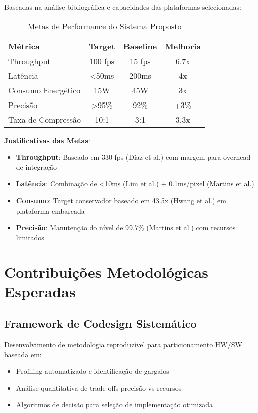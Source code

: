 Baseadas na análise bibliográfica e capacidades das plataformas selecionadas:

\begin{table}[H]
\centering
\caption{Metas de Performance do Sistema Proposto}
\begin{tabular}{|l|c|c|c|}
\hline
\textbf{Métrica} & \textbf{Target} & \textbf{Baseline} & \textbf{Melhoria} \\
\hline
Throughput & 100 fps & 15 fps & 6.7x \\
Latência & <50ms & 200ms & 4x \\
Consumo Energético & 15W & 45W & 3x \\
Precisão & >95\% & 92\% & +3\% \\
Taxa de Compressão & 10:1 & 3:1 & 3.3x \\
\hline
\end{tabular}
\label{tab:performance_targets}
\end{table}

\textbf{Justificativas das Metas}:
\begin{itemize}
\item \textbf{Throughput}: Baseado em 330 fps (Díaz et al.) com margem para overhead de integração
\item \textbf{Latência}: Combinação de <10ms (Lim et al.) + 0.1ms/pixel (Martins et al.)
\item \textbf{Consumo}: Target conservador baseado em 43.5x (Hwang et al.) em plataforma embarcada
\item \textbf{Precisão}: Manutenção do nível de 99.7\% (Martins et al.) com recursos limitados
\end{itemize}

\section{Contribuições Metodológicas Esperadas}

\subsection{Framework de Codesign Sistemático}

Desenvolvimento de metodologia reproduzível para particionamento HW/SW baseada em:
\begin{itemize}
\item Profiling automatizado e identificação de gargalos
\item Análise quantitativa de trade-offs precisão vs recursos
\item Algoritmos de decisão para seleção de implementação otimizada
\end{itemize}

